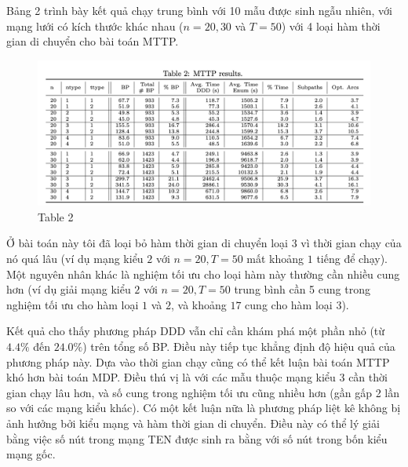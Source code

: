 \documentclass[../main.tex]{subfiles}
\begin{document}
Bảng 2 trình bày kết quả chạy trung bình với 10 mẫu được sinh ngẫu
nhiên, với mạng lưới có kích thước khác nhau (\(n=20,30\) và \(T=50\))
với 4 loại hàm thời gian di chuyển cho bài toán MTTP.

\begin{figure}
\centering
\includegraphics{images/Table2.png}
\caption{Table 2}
\end{figure}

Ở bài toán này tôi đã loại bỏ hàm thời gian di chuyển loại \(3\) vì thời
gian chạy của nó quá lâu (ví dụ mạng kiểu \(2\) với \(n=20, T=50\) mất
khoảng \(1\) tiếng để chạy). Một nguyên nhân khác là nghiệm tối ưu cho
loại hàm này thường cần nhiều cung hơn (ví dụ giải mạng kiểu \(2\) với
\(n=20, T=50\) trung bình cần 5 cung trong nghiệm tối ưu cho hàm loại
\(1\) và \(2\), và khoảng \(17\) cung cho hàm loại \(3\)).

Kết quả cho thấy phương pháp DDD vẫn chỉ cần khám phá một phần nhỏ (từ
\(4.4\%\) đến \(24.0\%\)) trên tổng số BP. Điều này tiếp tục khẳng định
độ hiệu quả của phương pháp này. Dựa vào thời gian chạy cũng có thể kết
luận bài toán MTTP khó hơn bài toán MDP. Điều thú vị là với các mẫu
thuộc mạng kiểu 3 cần thời gian chạy lâu hơn, và số cung trong nghiệm
tối ưu cũng nhiều hơn (gần gấp 2 lần so với các mạng kiểu khác). Có một
kết luận nữa là phương pháp liệt kê không bị ảnh hưởng bởi kiểu mạng và
hàm thời gian di chuyển. Điều này có thể lý giải bằng việc số nút trong
mạng TEN được sinh ra bằng với số nút trong bốn kiểu mạng gốc.
\backmatter
\end{document}
